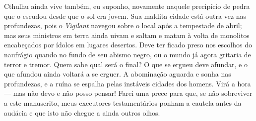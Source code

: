 Cthulhu ainda vive também, eu suponho, novamente naquele precipício de
pedra que o escudou desde que o sol era jovem. Sua maldita cidade está
outra vez nas profundezas, pois o \emph{Vigilant} navegou sobre o local
após a tempestade de abril; mas seus ministros em terra ainda uivam e
saltam e matam à volta de monolitos encabeçados por ídolos em lugares
desertos. Deve ter ficado preso nos escolhos do naufrágio quando no
fundo de seu abismo negro, ou o mundo já agora gritaria de terror e
tremor. Quem sabe qual será o final? O que se ergueu deve afundar, e o
que afundou ainda voltará a se erguer. A abominação aguarda e sonha nas
profundezas, e a ruína se espalha pelas instáveis cidades dos homens.
Virá a hora --- mas não devo e não posso pensar! Farei uma prece para
que, se não sobreviver a este manuscrito, meus executores testamentários
ponham a cautela antes da audácia e que isto não chegue a ainda outros
olhos.

